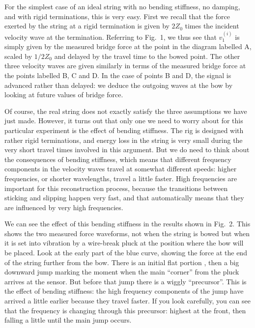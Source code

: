 
  For the simplest case of an ideal string with no bending stiffness, no 
  damping, and with rigid terminations, this is very easy. First we recall that 
  the force exerted by the string at a rigid termination is given by $2Z_0$ 
  times the incident velocity wave at the termination. Referring to Fig.\ 1, we 
  thus see that $v_1^{(i)}$ is simply given by the measured bridge force at the 
  point in the diagram labelled A, scaled by $1/2Z_0$ and delayed by the travel 
  time to the bowed point. The other three velocity waves are given similarly 
  in terms of the measured bridge force at the points labelled B, C and D. In 
  the case of points B and D, the signal is advanced rather than delayed: we 
  deduce the outgoing waves at the bow by looking at future values of bridge 
  force. 

  Of course, the real string does not exactly satisfy the three assumptions we 
  have just made. However, it turns out that only one we need to worry about 
  for this particular experiment is the effect of bending stiffness. The rig is 
  designed with rather rigid terminations, and energy loss in the string is 
  very small during the very short travel times involved in this argument. But 
  we do need to think about the consequences of bending stiffness, which means 
  that different frequency components in the velocity waves travel at somewhat 
  different speeds: higher frequencies, or shorter wavelengths, travel a little 
  faster. High frequencies are important for this reconstruction process, 
  because the transitions between sticking and slipping happen very fast, and 
  that automatically means that they are influenced by very high frequencies. 

  We can see the effect of this bending stiffness in the results shown in Fig.\ 
  2. This shows the two measured force waveforms, not when the string is bowed 
  but when it is set into vibration by a wire-break pluck at the position where 
  the bow will be placed. Look at the early part of the blue curve, showing the 
  force at the end of the string further from the bow. There is an initial flat 
  portion , then a big downward jump marking the moment when the main 
  ``corner'' from the pluck arrives at the sensor. But before that jump there 
  is a wiggly ``precursor''. This is the effect of bending stiffness: the high 
  frequency components of the jump have arrived a little earlier because they 
  travel faster. If you look carefully, you can see that the frequency is 
  changing through this precursor: highest at the front, then falling a little 
  until the main jump occurs. 

